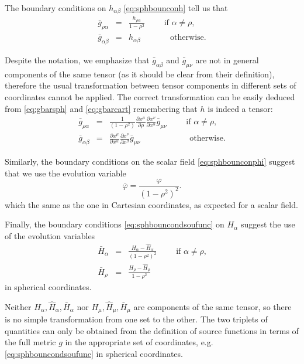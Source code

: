 \documentclass[a4paper,11pt]{article}
\numberwithin{equation}{section}
\begin{document}
The boundary conditions on $h_{\alpha\beta}$ \eqref{eq:sphbounconh} tell us that
\begin{eqnarray}\label{eq:gbarsph}
\bar{g}_{\rho\alpha}&=&\frac{h_{\rho\alpha} }{1-\rho^2}\qquad \textrm{ if $\alpha\neq\rho$}, \\ \nonumber
\bar{g}_{\alpha\beta}&=&h_{\alpha\beta}  \qquad\;\;\;\;\, \textrm{ otherwise}.
\end{eqnarray}

Despite the notation, we emphasize that $\bar{g}_{\alpha\beta}$ and $\bar{g}_{\mu\nu}$ are not in general components of the same tensor (as it should be clear from their definition), therefore the usual transformation between tensor components in different sets of coordinates cannot be applied. The correct transformation can be easily deduced from \eqref{eq:gbarsph} and \eqref{eq:gbarcart} remembering that $h$ is indeed a tensor: 
\begin{eqnarray}\label{eq:cartosph}
\bar{g}_{\rho\alpha}&=&\frac{1}{(1-\rho^2)}\frac{\partial x^\mu}{\partial \rho}\frac{\partial x^\nu}{\partial x^\alpha}\bar{g}_{\mu\nu}\qquad \textrm{ if $\alpha\neq\rho$}, \\ \nonumber
\bar{g}_{\alpha\beta}&=&\frac{\partial x^\mu}{\partial x^\alpha}\frac{\partial x^\nu}{\partial x^\beta}\bar{g}_{\mu\nu}\qquad\qquad \;\;\;\;\;\; \textrm{ otherwise}.
\end{eqnarray}

Similarly, the boundary conditions on the scalar field \eqref{eq:sphbounconphi} suggest that we use the evolution variable
\begin{equation}
\bar{\varphi}=\frac{\varphi }{(1-\rho^2)^2}.
\end{equation}
which the same as the one in Cartesian coordinates, as expected for a scalar field.

Finally, the boundary conditions \eqref{eq:sphbouncondsoufunc} on $H_\alpha$ suggest the use of the evolution variables
\begin{eqnarray}
 \bar{H}_\alpha&=&\frac{H_\alpha-\hat{H}_\alpha}{(1-\rho^2)^2 } \qquad \textrm{ if $\alpha\neq\rho$,} \\ \nonumber
  \bar{H}_\rho&=&\frac{H_\rho-\hat{H}_\rho}{1-\rho^2 }
 \end{eqnarray}
in spherical coordinates.

Neither $H_\alpha,\hat{H}_\alpha,\bar{H}_\alpha$ nor $H_\mu,\hat{H}_\mu,\bar{H}_\mu$ are components of the same tensor, so there is no simple transformation from one set to the other. The two triplets of quantities can only be obtained from the definition of source functions in terms of the full metric $g$ in the appropriate set of coordinates, e.g. \eqref{eq:sphbouncondsoufunc} in spherical coordinates.
\end{document}

